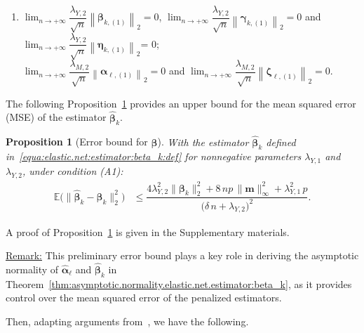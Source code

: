 \documentclass[
  12pt]{article}
\newtheorem{proposition}[thm]{Proposition}
\def\E{\mathbb{E}}
\def\M{\mathbf{m}}
\begin{document}
\begin{enumerate}
	\item[(A6)] $\lim_{n   \rightarrow   +\infty}  \dfrac{\lambda_{Y,2}}{ \sqrt{n} } \left\| \bm{\beta}_{k , (1)} \right\|_{2} = 0$, $\lim_{n   \rightarrow   +\infty}  \dfrac{\lambda_{Y,2}}{ \sqrt{n} } \left\| \bm{\gamma}_{k , (1)} \right\|_{2} = 0$ and $\lim_{n   \rightarrow   +\infty}  \dfrac{\lambda_{Y,2}}{ \sqrt{n} } \left\| \bm{\eta}_{k , (1)} \right\|_{2} \mbox{= 0}$;
	\\
	$\lim_{n   \rightarrow   +\infty}  \dfrac{\lambda_{M,2}}{ \sqrt{n} } \left\| \bm{\alpha}_{\ell , (1)} \right\|_{2} = 0$ and $\lim_{n   \rightarrow   +\infty}  \dfrac{\lambda_{M,2}}{ \sqrt{n} } \left\| \bm{\zeta}_{\ell , (1)} \right\|_{2} = 0$.
\end{enumerate}
The following Proposition~\ref{prop:upper-bound:elastic.net.beta_{k}} provides an upper bound for the mean squared error (MSE) of the estimator $\widehat{\bm{\beta}}_{k}$.
\begin{proposition} [Error bound for $\bm{\beta}$]%
	\label{prop:upper-bound:elastic.net.beta_{k}}
	With the estimator  $\widehat{\bm{\beta}}_{k}$ defined in~\eqref{equa:elastic.net:estimator:beta_k:def} for nonnegative parameters $\lambda_{Y,1}$ and  $\lambda_{Y,2}$, under condition (A1):
	\begin{align*}
		\E \Big( \big\| \widehat{\bm{\beta}}_{k} - \bm{\beta}_{k}   \big\|_{2}^{2}   \Big)
		& \leq  \dfrac{  4  \lambda_{Y,2}^{2}   \big\| \bm{\beta}_{k}   \big\|_{2}^{2}  +  8 \, np  \,     \big\| \M \big\|_{\infty}^2   +  \lambda_{Y,1}^{2} \,  p
		}{ \big(  \delta \,  n  +   \lambda_{Y,2}  \big)^{2} }.
	\end{align*}
\end{proposition}
A proof of Proposition~\ref{prop:upper-bound:elastic.net.beta_{k}}  is given in the Supplementary materials.  

\underline{Remark:} This preliminary error bound plays a key role in deriving the asymptotic normality of $\widehat{\bm{\alpha}}_\ell$ and $\widehat{\bm{\beta}}_k$ in Theorem~\ref{thm:asymptotic.normality.elastic.net.estimator:beta_k}, as it provides control over the mean squared error of the penalized estimators.

Then, adapting arguments from~\cite{Zou-Zhang:2009}, we have the following.

\medskip
\end{document}
